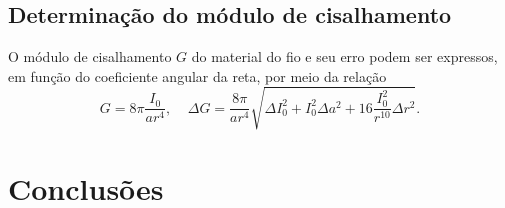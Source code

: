 \documentclass[12pt,a4paper]{article}
\begin{document}
\subsection{Determinação do módulo de cisalhamento}
O módulo de cisalhamento $G$ do material do fio e seu erro podem ser expressos, em função do coeficiente angular da reta, por meio da relação
$$G = 8\pi\frac {I_0}{ar^4}, \; \; \; \; \Delta G = \frac {8\pi}{ar^4} \sqrt{\Delta I_0^2 + I_0^2 \Delta a^2 + 16 \frac{I_0^2}{r^{10}} \Delta r^2}.$$

\section{Conclusões}
\end{document}
